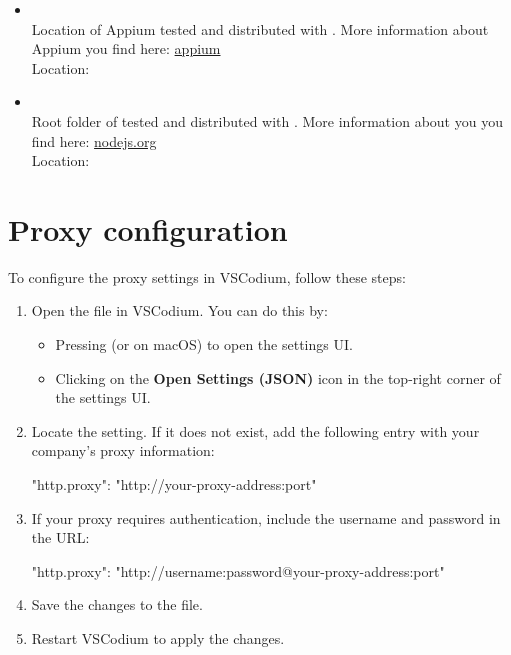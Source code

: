 \begin{itemize}
   \item {}\\
         Location of Appium tested and distributed with \rfw. More information about Appium you find here:
         \href{https://appium.io/}{appium}\\
         Location: 

   \item {}\\
         Root folder of  tested and distributed with \rfw. More information about  you you find here:
         \href{https://nodejs.org/en/}{nodejs.org}\\
         Location: 

\end{itemize}

\section{Proxy configuration}\label{fw-environment-environment-proxy-configuration}

To configure the proxy settings in VSCodium, follow these steps:

\begin{enumerate}
   \item Open the  file in VSCodium. You can do this by:
   \begin{itemize}
      \item Pressing  (or  on macOS) to open the settings UI.
      \item Clicking on the \textbf{Open Settings (JSON)} icon in the top-right corner of the settings UI.
   \end{itemize}

   \item Locate the  setting. If it does not exist, add the following entry with your company's proxy information:\begin{pythoncode}
"http.proxy": "http://your-proxy-address:port"\end{pythoncode}

   \item If your proxy requires authentication, include the username and password in the URL:\begin{pythoncode}
"http.proxy": "http://username:password@your-proxy-address:port"\end{pythoncode}

   \item Save the changes to the  file.

   \item Restart VSCodium to apply the changes.
\end{enumerate}
